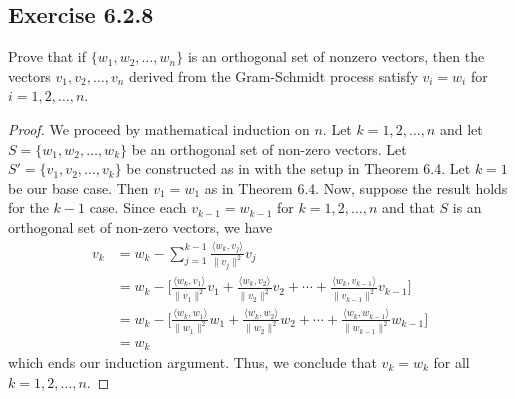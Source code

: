 \subsection*{Exercise 6.2.8} Prove that if \( \{ {w}_{1}, {w}_{2}, \dots, {w}_{n} \}  \) is an orthogonal set of nonzero vectors, then the vectors \( {v}_{1}, {v}_{2}, \dots, {v}_{n} \) derived from the Gram-Schmidt process satisfy \( {v}_{i} = {w}_{i} \) for \( i = 1,2,\dots, n \).
\begin{proof}
    We proceed by mathematical induction on \( n  \). Let \( k = 1,2, \dots, n  \) and let \( S = \{ {w}_{1}, {w}_{2}, \dots, {w}_{k} \}  \) be an orthogonal set of non-zero vectors. Let \( S' = \{ {v}_{1}, {v}_{2}, \dots, {v}_{k} \}  \) be constructed as in with the setup in Theorem 6.4. Let \( k=1  \) be our base case. Then \( {v}_{1} = {w}_{1} \) as in Theorem 6.4. Now, suppose the result holds for the \( k-1  \) case. Since each \( {v}_{k-1} = {w}_{k-1}   \) for \( k = 1,2,\dots, n  \) and that \( S \) is an orthogonal set of non-zero vectors, we have 
    \begin{align*}
        {v}_{k} &= {w}_{k} - \sum_{ j=1 }^{ k-1 } \frac{ \langle {w}_{k} , {v}_{j} \rangle }{ \|{v}_{j}\|^{2} } {v}_{j} \\
                &= {w}_{k} - \Big[ \frac{ \langle {w}_{k} , {v}_{1} \rangle }{ \|{v}_{1}\|^{2} } {v}_{1} + \frac{ \langle {w}_{k} , {v}_{2} \rangle }{ \|{v}_{2}\|^{2} } {v}_{2} + \cdots + \frac{ \langle {w}_{k} , {v}_{k-1} \rangle }{ \|{v}_{k-1}\|^{2} }  {v}_{k-1}\Big] \\
                &= {w}_{k} - \Big[ \frac{ \langle {w}_{k} , {w}_{1} \rangle }{ \|{w}_{1}\|^{2} } {w}_{1} + \frac{ \langle {w}_{k} , {w}_{2} \rangle }{ \|{w}_{2}\|^{2} } {w}_{2} + \cdots + \frac{ \langle {w}_{k} , {w}_{k-1} \rangle }{ \|{w}_{k-1}\|^{2} }  {w}_{k-1}\Big] \\
                &= {w}_{k}
    \end{align*}
    which ends our induction argument. Thus, we conclude that \( {v}_{k} = {w}_{k}  \) for all \( k = 1,2,\dots, n  \).
\end{proof}

